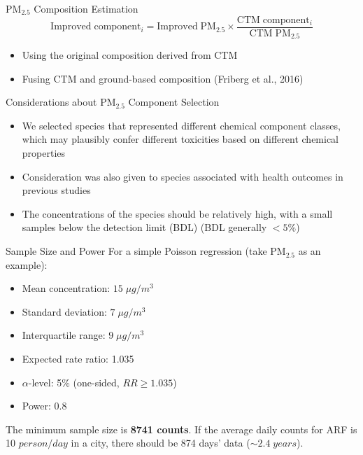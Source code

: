 \documentclass[handout]{beamer} %
\begin{document}
\begin{frame}{PM$_{2.5}$ Composition Estimation}
    \begin{equation*}
        \mathrm{Improved\;component_\mathit{i}=Improved\;PM_{2.5}\times\frac{CTM\;component_\mathit{i}}{CTM\;PM_{2.5}}}
    \end{equation*}
    \begin{itemize}
        \item Using the original composition derived from CTM
        \item Fusing CTM and ground-based composition (Friberg et al., 2016)
    \end{itemize}
\end{frame}

\begin{frame}{Considerations about PM$_{2.5}$ Component Selection}
    \begin{itemize}
        \item We selected species that represented different chemical component classes, which may plausibly confer different toxicities based on different chemical properties
        \item Consideration was also given to species associated with health outcomes in previous studies
        \item The concentrations of the species should be relatively high, with a small samples below the detection limit (BDL) (BDL generally $<5\%$)
    \end{itemize}
\end{frame}

\begin{frame}{Sample Size and Power}
    For a simple Poisson regression (take PM$_{2.5}$ as an example):
    \begin{itemize}
        \item Mean concentration: $15\;\mu g/m^3$
        \item Standard deviation: $7\;\mu g/m^3$
        \item Interquartile range: $9\;\mu g/m^3$
        \item Expected rate ratio: 1.035
        \item $\alpha$-level: 5\% (one-sided, $RR \geq 1.035$)
        \item Power: 0.8
    \end{itemize}
    The minimum sample size is \textbf{8741 counts}. If the average daily counts for ARF is 10 $person/day$ in a city, there should be 874 days' data ($\sim 2.4\;years$).
\end{frame}
\end{document}
